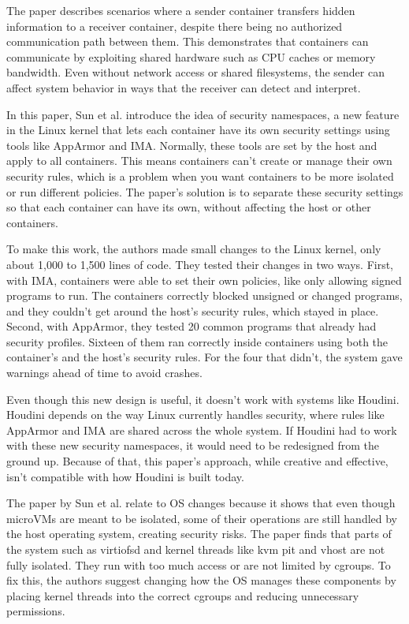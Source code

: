 \begin{doublespace}
The paper describes scenarios where a sender container transfers hidden information to a receiver container, despite there being no authorized communication path between them. This demonstrates that containers can communicate by exploiting shared hardware such as CPU caches or memory bandwidth. Even without network access or shared filesystems, the sender can affect system behavior in ways that the receiver can detect and interpret.

In this paper, Sun et al. \cite{sun2018security} introduce the idea of security namespaces, a new feature in the Linux kernel that lets each container have its own security settings using tools like AppArmor and IMA. Normally, these tools are set by the host and apply to all containers. This means containers can’t create or manage their own security rules, which is a problem when you want containers to be more isolated or run different policies. The paper’s solution is to separate these security settings so that each container can have its own, without affecting the host or other containers.

To make this work, the authors made small changes to the Linux kernel, only about 1,000 to 1,500 lines of code. They tested their changes in two ways. First, with IMA, containers were able to set their own policies, like only allowing signed programs to run. The containers correctly blocked unsigned or changed programs, and they couldn’t get around the host’s security rules, which stayed in place. Second, with AppArmor, they tested 20 common programs that already had security profiles. Sixteen of them ran correctly inside containers using both the container’s and the host’s security rules. For the four that didn’t, the system gave warnings ahead of time to avoid crashes.

Even though this new design is useful, it doesn’t work with systems like Houdini. Houdini depends on the way Linux currently handles security, where rules like AppArmor and IMA are shared across the whole system. If Houdini had to work with these new security namespaces, it would need to be redesigned from the ground up. Because of that, this paper’s approach, while creative and effective, isn’t compatible with how Houdini is built today.

The paper by Sun et al. \cite{sun2018security} relate to OS changes because it shows that even though microVMs are meant to be isolated, some of their operations are still handled by the host operating system, creating security risks. The paper finds that parts of the system such as virtiofsd and kernel threads like kvm pit and vhost are not fully isolated. They run with too much access or are not limited by cgroups. To fix this, the authors suggest changing how the OS manages these components by placing kernel threads into the correct cgroups and reducing unnecessary permissions.



\end{doublespace}
